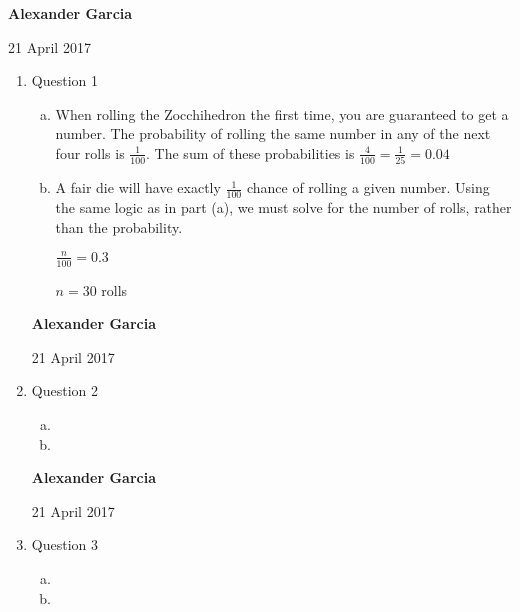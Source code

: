 \documentclass[11pt]{article}
\begin{document}
\textbf{Alexander Garcia}

21 April 2017 \\

	\begin{enumerate}

		\item Question 1

			\begin{enumerate}[(a)]

				\item When rolling the Zocchihedron the first time, you are guaranteed to get a number.
					The probability of rolling the same number in any of the next four rolls is
					$\frac{1}{100}$. The sum of these probabilities is $\frac{4}{100} = \frac{1}{25} = 0.04$\\

				\item A fair die will have exactly $\frac{1}{100}$ chance of rolling a given number.
					Using the same logic as in part (a), we must solve for the number of rolls, rather
					than the probability.

					$\frac{n}{100} = 0.3$

					$n = 30$ rolls \\


			\end{enumerate}

\newpage

\textbf{Alexander Garcia}

21 April 2017 \\

		\item Question 2

			\begin{enumerate}[(a)]

				\item

				\item

			\end{enumerate}
\newpage
\textbf{Alexander Garcia}

21 April 2017 \\

		\item Question 3

			\begin{enumerate}[(a)]

				\item

				\item


\end{enumerate}
\end{enumerate}
\end{document}
